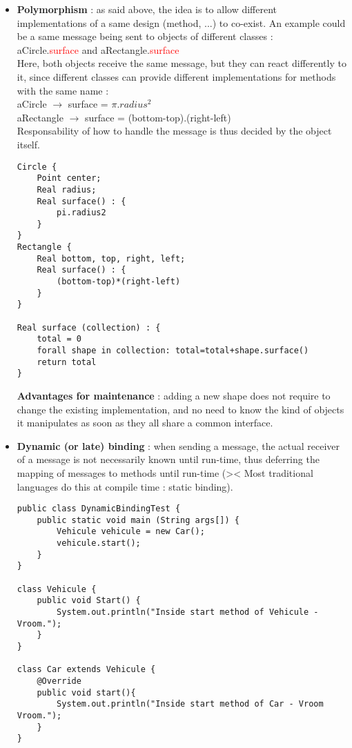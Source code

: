 \begin{itemize}
\item \textbf{Polymorphism} : as said above, the idea is to allow different implementations of a same design (method, ...) to co-exist. An example could be a same message being sent to objects of different classes :\\
aCircle.\textcolor{red}{surface} and aRectangle.\textcolor{red}{surface} \\
Here, both objects receive the same message, but they can react differently to it, since different classes can provide different implementations for methods with the same name : \\
aCircle $\rightarrow$ surface = $\pi$.$radius^{2}$\\
aRectangle $\rightarrow$ surface = (bottom-top).(right-left)\\
Responsability of how to handle the message is thus decided by the object itself.
\begin{lstlisting}[caption=Pseudocode example of Polymorphism]
Circle {
	Point center; 
	Real radius;
	Real surface() : { 
		pi.radius2
	}
}
Rectangle {
	Real bottom, top, right, left;
	Real surface() : { 
    	(bottom-top)*(right-left) 
    }
}

Real surface (collection) : {
	total = 0
	forall shape in collection: total=total+shape.surface()
	return total
}
\end{lstlisting}
\textbf{Advantages for maintenance} : adding a new shape does not require to change the existing implementation, and no need to know the kind of objects it manipulates as soon as they all share a common interface.

\item \textbf{Dynamic (or late) binding} : when sending a message, the actual receiver of a message is not necessarily known until run-time, thus deferring the mapping of messages to methods until run-time (>< Most traditional languages do this at compile time : static binding).\\
\begin{lstlisting}[caption=Pseudocode example of dynamic binding]
public class DynamicBindingTest {
	public static void main (String args[]) {
    	Vehicule vehicule = new Car();
        vehicule.start();
    }
}

class Vehicule {
	public void Start() {
    	System.out.println("Inside start method of Vehicule - Vroom.");
    }
}

class Car extends Vehicule {
	@Override
    public void start(){
    	System.out.println("Inside start method of Car - Vroom Vroom.");
    }
}


\end{lstlisting}
\end{itemize}
